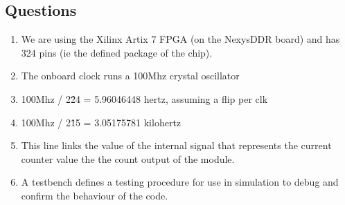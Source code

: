 \documentclass[11pt]{article}
\begin{document}
\begin{preview}
\section{Questions}

\begin{enumerate}
        \item We are using the Xilinx Artix 7 FPGA (on the NexysDDR board) and has 324 pins (ie the defined package of the chip). 
        \item The onboard clock runs a 100Mhz crystal oscillator
        \item 100Mhz / 2\^24 = 5.96046448 hertz, assuming a flip per clk
        \item 100Mhz / 2\^15 = 3.05175781 kilohertz
        \item This line links the value of the internal signal that represents the current counter value the the count output of the module.
        \item A testbench defines a testing procedure for use in simulation to debug and confirm the behaviour of the code.
\end{enumerate}

\end{preview}
\end{document}
